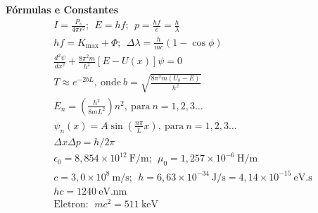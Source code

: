 
{\large \textbf{Fórmulas e Constantes}}
\begin{align*}
	&I=\frac{P_s}{4\pi r^2};~~E=hf;~~p=\frac{hf}{c}=\frac{h}{\lambda}&\\
	&hf=K_\mathrm{max}+\Phi;~~\Delta\lambda=\frac{h}{mc}(1-\cos\phi)&\\
	&\frac{d^2\psi}{dx^2}+\frac{8\pi^2 m}{h^2}[E-U(x)]\psi=0&\\
	&T\approx e^{-2bL},~\mathrm{onde}~b=\sqrt{\frac{8\pi^2 m(U_b-E)}{h^2}}&\\
	&E_n=\left(\frac{h^2}{8mL^2}\right)n^2,~\mathrm{para}~n=1,2,3\dots&\\
	&\psi_n(x)=A\sin\left(\frac{n\pi}{L}x\right),~\mathrm{para}~n=1,2,3\dots&\\
	&\Delta x \Delta p = h/2\pi&\\
	&\epsilon_0 = 8,854\times10^{12}~\mathrm{F/m};~~\mu_0 = 1,257\times10^{-6}~\mathrm{H/m}&\\
	&c=3,0\times10^8~\mathrm{m/s};~~h=6,63\times10^{-34}~\mathrm{J/s}=4,14\times10^{-15}~\mathrm{eV.s}&\\
	&hc=1240~\mathrm{eV.nm}&\\
	&\mathrm{Eletron:}~~mc^2 = 511~\mathrm{keV}&\\
\end{align*}
